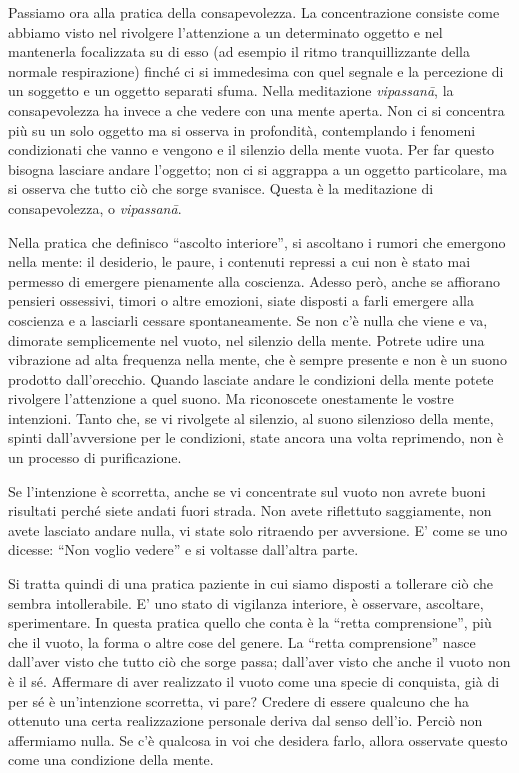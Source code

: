 
Passiamo ora alla pratica della consapevolezza. La concentrazione
consiste come abbiamo visto nel rivolgere l'attenzione a un determinato
oggetto e nel mantenerla focalizzata su di esso (ad esempio il ritmo
tranquillizzante della normale respirazione) finché ci si immedesima con
quel segnale e la percezione di un soggetto e un oggetto separati sfuma.
Nella meditazione \textit{vipassanā}, la consapevolezza ha invece a che vedere
con una mente aperta. Non ci si concentra più su un solo oggetto ma si
osserva in profondità, contemplando i fenomeni condizionati che vanno e
vengono e il silenzio della mente vuota. Per far questo bisogna lasciare
andare l'oggetto; non ci si aggrappa a un oggetto particolare, ma si
osserva che tutto ciò che sorge svanisce. Questa è la meditazione di
consapevolezza, o \textit{vipassanā}.

Nella pratica che definisco ``ascolto interiore'', si ascoltano i rumori
che emergono nella mente: il desiderio, le paure, i contenuti repressi a
cui non è stato mai permesso di emergere pienamente alla coscienza.
Adesso però, anche se affiorano pensieri ossessivi, timori o altre
emozioni, siate disposti a farli emergere alla coscienza e a lasciarli
cessare spontaneamente. Se non c'è nulla che viene e va, dimorate
semplicemente nel vuoto, nel silenzio della mente. Potrete udire una
vibrazione ad alta frequenza nella mente, che è sempre presente e non è
un suono prodotto dall'orecchio. Quando lasciate andare le condizioni
della mente potete rivolgere l'attenzione a quel suono. Ma riconoscete
onestamente le vostre intenzioni. Tanto che, se vi rivolgete al
silenzio, al suono silenzioso della mente, spinti dall'avversione per le
condizioni, state ancora una volta reprimendo, non è un processo di
purificazione.

Se l'intenzione è scorretta, anche se vi concentrate sul vuoto non
avrete buoni risultati perché siete andati fuori strada. Non avete
riflettuto saggiamente, non avete lasciato andare nulla, vi state solo
ritraendo per avversione. E' come se uno dicesse: ``Non voglio vedere'' e
si voltasse dall'altra parte.

Si tratta quindi di una pratica paziente in cui siamo disposti a
tollerare ciò che sembra intollerabile. E' uno stato di vigilanza
interiore, è osservare, ascoltare, sperimentare. In questa pratica
quello che conta è la ``retta comprensione'', più che il vuoto, la forma o
altre cose del genere. La ``retta comprensione'' nasce dall'aver visto che
tutto ciò che sorge passa; dall'aver visto che anche il vuoto non è il
sé. Affermare di aver realizzato il vuoto come una specie di conquista,
già di per sé è un'intenzione scorretta, vi pare? Credere di essere
qualcuno che ha ottenuto una certa realizzazione personale deriva dal
senso dell'io. Perciò non affermiamo nulla. Se c'è qualcosa in voi che
desidera farlo, allora osservate questo come una condizione della mente.

